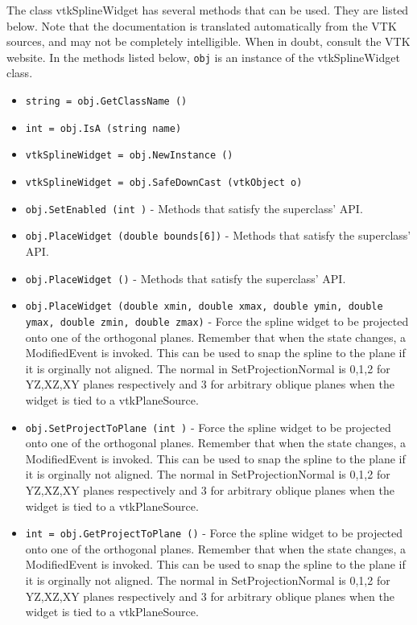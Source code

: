 The class vtkSplineWidget has several methods that can be used.
  They are listed below.
Note that the documentation is translated automatically from the VTK sources,
and may not be completely intelligible.  When in doubt, consult the VTK website.
In the methods listed below, \verb|obj| is an instance of the vtkSplineWidget class.
\begin{itemize}
\item  \verb|string = obj.GetClassName ()|

\item  \verb|int = obj.IsA (string name)|

\item  \verb|vtkSplineWidget = obj.NewInstance ()|

\item  \verb|vtkSplineWidget = obj.SafeDownCast (vtkObject o)|

\item  \verb|obj.SetEnabled (int )| -  Methods that satisfy the superclass' API.

\item  \verb|obj.PlaceWidget (double bounds[6])| -  Methods that satisfy the superclass' API.

\item  \verb|obj.PlaceWidget ()| -  Methods that satisfy the superclass' API.

\item  \verb|obj.PlaceWidget (double xmin, double xmax, double ymin, double ymax, double zmin, double zmax)| -  Force the spline widget to be projected onto one of the orthogonal planes.
 Remember that when the state changes, a ModifiedEvent is invoked.
 This can be used to snap the spline to the plane if it is orginally
 not aligned.  The normal in SetProjectionNormal is 0,1,2 for YZ,XZ,XY
 planes respectively and 3 for arbitrary oblique planes when the widget
 is tied to a vtkPlaneSource.

\item  \verb|obj.SetProjectToPlane (int )| -  Force the spline widget to be projected onto one of the orthogonal planes.
 Remember that when the state changes, a ModifiedEvent is invoked.
 This can be used to snap the spline to the plane if it is orginally
 not aligned.  The normal in SetProjectionNormal is 0,1,2 for YZ,XZ,XY
 planes respectively and 3 for arbitrary oblique planes when the widget
 is tied to a vtkPlaneSource.

\item  \verb|int = obj.GetProjectToPlane ()| -  Force the spline widget to be projected onto one of the orthogonal planes.
 Remember that when the state changes, a ModifiedEvent is invoked.
 This can be used to snap the spline to the plane if it is orginally
 not aligned.  The normal in SetProjectionNormal is 0,1,2 for YZ,XZ,XY
 planes respectively and 3 for arbitrary oblique planes when the widget
 is tied to a vtkPlaneSource.


\end{itemize}
